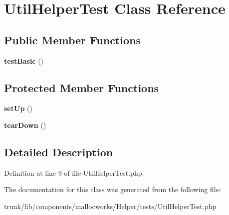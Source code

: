 \hypertarget{class_util_helper_test}{
\section{UtilHelperTest Class Reference}
\label{class_util_helper_test}
}
\subsection*{Public Member Functions}
\begin{DoxyCompactItemize}
\item 
\hypertarget{class_util_helper_test_a43130cb481135ee931f1562a1503378a}{
{\bfseries testBasic} ()}
\label{class_util_helper_test_a43130cb481135ee931f1562a1503378a}

\end{DoxyCompactItemize}
\subsection*{Protected Member Functions}
\begin{DoxyCompactItemize}
\item 
\hypertarget{class_util_helper_test_a0bc688732d2b3b162ffebaf7812e78da}{
{\bfseries setUp} ()}
\label{class_util_helper_test_a0bc688732d2b3b162ffebaf7812e78da}

\item 
\hypertarget{class_util_helper_test_a80fe3d17e658907fc75346a0ec9d6fc7}{
{\bfseries tearDown} ()}
\label{class_util_helper_test_a80fe3d17e658907fc75346a0ec9d6fc7}

\end{DoxyCompactItemize}


\subsection{Detailed Description}


Definition at line 9 of file UtilHelperTest.php.



The documentation for this class was generated from the following file:\begin{DoxyCompactItemize}
\item 
trunk/lib/components/mallocworks/Helper/tests/UtilHelperTest.php\end{DoxyCompactItemize}
